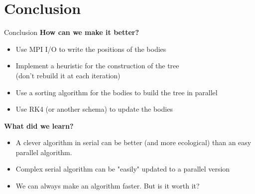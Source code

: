 \documentclass[10pt]{beamer}
\newcommand{\grille}{
 \begin{tikzpicture}[overlay,remember picture]
   \begin{scope}[shift={(current page.south west)}]
     \draw[gray!50] (0,0) grid[step=2mm] (current page.north east);
     \draw[red!50] (0,0) grid[step=1cm] (current page.north east);
     \draw (0.2,1) node {1};
     \draw (0.2,2) node {2};
     \draw (0.2,3) node {3};
     \draw (0.2,4) node {4};
     \draw (0.2,5) node {5};
     \draw (0.2,6) node {6};
     \draw (0.2,7) node {7};
     \draw (0.2,8) node {8};
     \draw (0.2,9) node {9};
     \draw (1,0.5) node {1};
     \draw (2,0.5) node {2};
     \draw (3,0.5) node {3};
     \draw (4,0.5) node {4};
     \draw (5,0.5) node {5};
     \draw (6,0.5) node {6};
     \draw (7,0.5) node {7};
     \draw (8,0.5) node {8};
     \draw (9,0.5) node {9};
     \draw (10,0.5) node {10};
     \draw (11,0.5) node {11};
     \draw (12,0.5) node {12};
   \end{scope}
 \end{tikzpicture}
 }
\begin{document}
\section{Conclusion}

\begin{frame}{Conclusion}
\bf How can we make it better?
\normalfont
\begin{itemize}
\item Use MPI I/O to write the positions of the bodies
\item Implement a heuristic for the construction of the tree \\(don't rebuild it at each iteration)
\item Use a sorting algorithm for the bodies to build the tree in parallel
\item Use RK4 (or another schema) to update the bodies
\end{itemize}
\bf What did we learn? 
\normalfont
\begin{itemize}
\item A clever algorithm in serial can be better (and more ecological) than an easy parallel algorithm.
\item Complex serial algorithm can be "easily" updated to a parallel version
\item We can always make an algorithm faster. But is it worth it?
\end{itemize}
\end{frame}

\begin{frame}[standout]
\end{frame}
\end{document}
